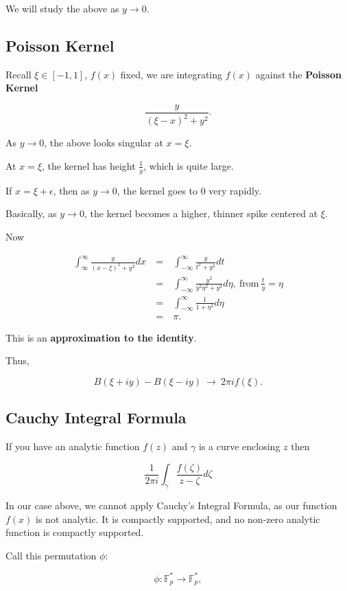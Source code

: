 \documentclass[12pt,letterpaper]{report}
\newcommand\be{\begin{equation}}
\newcommand\ee{\end{equation}}
\newcommand\bea{\begin{eqnarray}}
\newcommand\eea{\end{eqnarray}}
\newcommand{\F}{\mathbb{F}}
\newcommand{\Fp}{ \F_p }
\newcommand{\Fpf}{ \Fp^{*} }
\begin{document}
We will study the above as $y \to 0$.

\subsection{Poisson Kernel}

Recall $\xi \in [-1,1]$, $f(x)$ fixed, we are integrating $f(x)$
against the \textbf{Poisson Kernel}

\be \frac{y}{( \xi - x)^2 + y^2}. \ee

As $y \to 0$, the above looks singular at $x = \xi$.

At $x = \xi$, the kernel has height $\frac{1}{y}$, which is quite
large.

If $x = \xi + \epsilon$, then as $y \to 0$, the kernel goes to $0$
very rapidly.

Basically, as $y \to 0$, the kernel becomes a higher, thinner
spike centered at $\xi$.

Now

\bea \int_{\infty}^\infty \frac{y}{ (x - \xi)^2 + y^2} dx & \ = \
& \int_{-\infty}^\infty \frac{y}{t^2 + y^2} dt \nonumber\\ & \ = \
& \int_{-\infty}^\infty \frac{ y^2}{ y^2 \eta^2 + y^2} d\eta, \
\text{from} \ \frac{t}{y} = \eta \nonumber\\ & \ = \ &
\int_{-\infty}^\infty \frac{1}{1 + \eta^2} d\eta \nonumber\\ & \ =
\ & \pi. \eea

This is an \textbf{approximation to the identity}.

Thus,

\be B(\xi + iy) - B(\xi - iy) \ \to \ 2\pi i f(\xi). \ee


\subsection{Cauchy Integral Formula}

If you have an analytic function $f(z)$ and $\gamma$ is a curve
enclosing $z$ then

\be \frac{1}{2\pi i} \int_\gamma \frac{ f(\zeta) }{z - \zeta}
d\zeta  \ee

In our case above, we cannot apply Cauchy's Integral Formula, as
our function $f(x)$ is not analytic. It is compactly supported,
and no non-zero analytic function is compactly supported.

Call this permutation $\phi$:

\be \phi: \Fpf \to \Fpf, \ee
\end{document}
